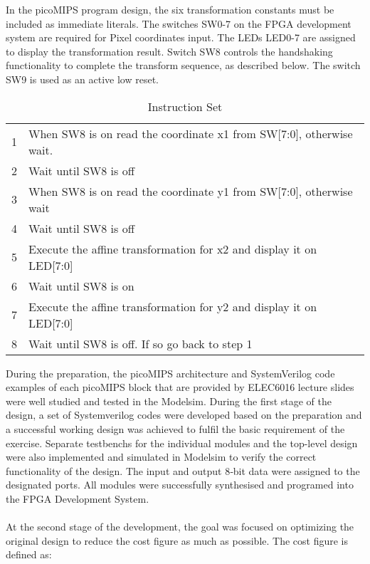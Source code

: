 In the picoMIPS program design, the six transformation constants must be included as immediate literals. The switches SW0-7 on the FPGA development system are required for Pixel coordinates input. The LEDs LED0-7 are assigned to display the transformation result. Switch SW8 controls the handshaking functionality to complete the transform sequence, as described below. The switch SW9 is used as an active low reset.
\begin{table}[H]
%
\centering %
\begin{tabular}{ll}
\hline
1 & When SW8 is on read the coordinate x1 from SW{[}7:0{]}, otherwise wait. \\ 
2 & Wait until SW8 is off                                                   \\
3 & When SW8 is on read the coordinate y1 from SW{[}7:0{]}, otherwise wait  \\
4 & Wait until SW8 is off                                                   \\
5 & Execute the affine transformation for x2 and display it on LED{[}7:0{]}        \\
6 & Wait until SW8 is on                                                    \\
7 & Execute the affine transformation for y2 and display it on LED{[}7:0{]}                                              \\
8 & Wait until SW8 is off. If so go back to step 1                          \\ \hline

\end{tabular}
\caption{Instruction Set} %
\end{table}
During the preparation, the picoMIPS architecture and SystemVerilog code examples of each picoMIPS block that are provided by ELEC6016 lecture slides were well studied and tested in the Modelsim. During the first stage of the design, a set of Systemverilog codes were developed based on the preparation and a successful working design was achieved to fulfil the basic requirement of the exercise. Separate testbenchs for the individual modules and the top-level design were also implemented and simulated in Modelsim to verify the correct functionality of the design. The input and output 8‐bit data were assigned to the designated ports. All modules were successfully synthesised and programed into the FPGA Development System. \\\\
At the second stage of the development, the goal was focused on optimizing the original design to reduce the cost figure as much as possible. The cost figure is defined as:\\\\

